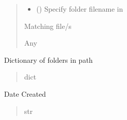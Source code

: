 \documentclass[letterpaper,10pt,english]{sphinxmanual}
\begin{document}
\begin{fulllineitems}
\begin{fulllineitems}
\begin{quote}
\begin{description}
\begin{itemize}
\item {} 
\sphinxAtStartPar
{} () \textendash{} Specify folder filename in

\end{itemize}

\sphinxAtStartPar
Matching file/s

\sphinxAtStartPar
Any

\end{description}\end{quote}

\end{fulllineitems}


\begin{fulllineitems}
\label{\detokenize{ExperimentHierarchy:ExperimentHierarchy.CollectedDataFolder.folders}}
\pysigstartsignatures
{}
\pysigstopsignatures
\sphinxAtStartPar
Dictionary of folders in path
\begin{quote}\begin{description}
\sphinxAtStartPar
dict

\end{description}\end{quote}

\end{fulllineitems}


\begin{fulllineitems}
\label{\detokenize{ExperimentHierarchy:ExperimentHierarchy.CollectedDataFolder.instance_date}}
\pysigstartsignatures
{}
\pysigstopsignatures
\sphinxAtStartPar
Date Created
\begin{quote}\begin{description}
\sphinxAtStartPar
str


\end{description}
\end{quote}
\end{fulllineitems}
\end{fulllineitems}
\end{document}
